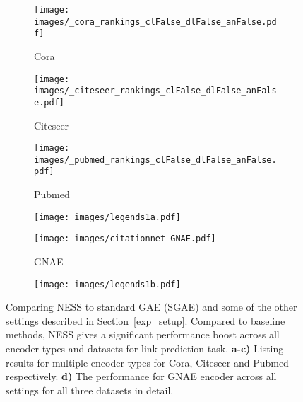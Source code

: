 \documentclass{article}
\begin{document}
\begin{figure*}[t]
\vskip 0.2in
\begin{center}
     \begin{subfigure}[c]{0.19\textwidth}
         \texttt{[image: images/\_cora\_rankings\_clFalse\_dlFalse\_anFalse.pdf]}
         \caption{Cora}
     \end{subfigure}
     \begin{subfigure}[c]{0.19\textwidth}
         \texttt{[image: images/\_citeseer\_rankings\_clFalse\_dlFalse\_anFalse.pdf]}
         \caption{Citeseer}
     \end{subfigure}
     \begin{subfigure}[c]{0.19\textwidth}
         \texttt{[image: images/\_pubmed\_rankings\_clFalse\_dlFalse\_anFalse.pdf]}
         \caption{Pubmed}
     \end{subfigure}
     \begin{subfigure}[c]{0.08\textwidth}
         \texttt{[image: images/legends1a.pdf]}
     \end{subfigure}
     \begin{subfigure}[c]{0.19\textwidth}
         \texttt{[image: images/citationnet\_GNAE.pdf]}
         \caption{GNAE}
     \end{subfigure}
     \begin{subfigure}[c]{0.12\textwidth}
         \texttt{[image: images/legends1b.pdf]}
     \end{subfigure}     
\caption{Comparing NESS to standard GAE (SGAE) and some of the other settings described in Section~\ref{exp_setup}.  Compared to baseline methods, NESS gives a significant performance boost across all encoder types and datasets for link prediction task. \textbf{a-c)} Listing results for multiple encoder types for Cora, Citeseer and Pubmed respectively. \textbf{d)} The performance for GNAE encoder across all settings for all three datasets in detail.}\label{fig:comparing_dynamic_to_static}
\end{center}
\vskip -0.2in
\end{figure*}
\end{document}
